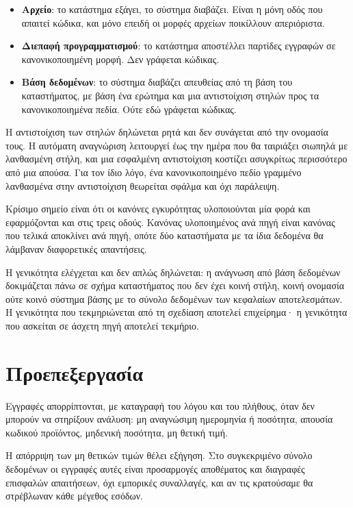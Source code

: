\begin{itemize}
  \item \textbf{Αρχείο}: το κατάστημα εξάγει, το σύστημα διαβάζει. Είναι η
        μόνη οδός που απαιτεί κώδικα, και μόνο επειδή οι μορφές αρχείων
        ποικίλλουν απεριόριστα.
  \item \textbf{Διεπαφή προγραμματισμού}: το κατάστημα αποστέλλει παρτίδες
        εγγραφών σε κανονικοποιημένη μορφή. Δεν γράφεται κώδικας.
  \item \textbf{Βάση δεδομένων}: το σύστημα διαβάζει απευθείας από τη βάση του
        καταστήματος, με βάση ένα ερώτημα και μια αντιστοίχιση στηλών προς τα
        κανονικοποιημένα πεδία. Ούτε εδώ γράφεται κώδικας.
\end{itemize}

Η αντιστοίχιση των στηλών δηλώνεται ρητά και δεν συνάγεται από την ονομασία
τους. Η αυτόματη αναγνώριση λειτουργεί έως την ημέρα που θα ταιριάξει σιωπηλά
με λανθασμένη στήλη, και μια εσφαλμένη αντιστοίχιση κοστίζει ασυγκρίτως
περισσότερο από μια απούσα. Για τον ίδιο λόγο, ένα κανονικοποιημένο πεδίο
γραμμένο λανθασμένα στην αντιστοίχιση θεωρείται σφάλμα και όχι παράλειψη.

Κρίσιμο σημείο είναι ότι οι κανόνες εγκυρότητας υλοποιούνται μία φορά και
εφαρμόζονται και στις τρεις οδούς. Κανόνας υλοποιημένος ανά πηγή είναι κανόνας
που τελικά αποκλίνει ανά πηγή, οπότε δύο καταστήματα με τα ίδια δεδομένα θα
λάμβαναν διαφορετικές απαντήσεις.

Η γενικότητα ελέγχεται και δεν απλώς δηλώνεται: η ανάγνωση από βάση δεδομένων
δοκιμάζεται πάνω σε σχήμα καταστήματος που δεν έχει κοινή στήλη, κοινή ονομασία
ούτε κοινό σύστημα βάσης με το σύνολο δεδομένων των κεφαλαίων αποτελεσμάτων. Η
γενικότητα που τεκμηριώνεται από τη σχεδίαση αποτελεί επιχείρημα· η γενικότητα
που ασκείται σε άσχετη πηγή αποτελεί τεκμήριο.

\section{Προεπεξεργασία}

Εγγραφές απορρίπτονται, με καταγραφή του λόγου και του πλήθους, όταν δεν
μπορούν να στηρίξουν ανάλυση: μη αναγνώσιμη ημερομηνία ή ποσότητα, απουσία
κωδικού προϊόντος, μηδενική ποσότητα, μη θετική τιμή.

Η απόρριψη των μη θετικών τιμών θέλει εξήγηση. Στο συγκεκριμένο σύνολο
δεδομένων οι εγγραφές αυτές είναι προσαρμογές αποθέματος και διαγραφές
επισφαλών απαιτήσεων, όχι εμπορικές συναλλαγές, και αν τις κρατούσαμε θα
στρέβλωναν κάθε μέγεθος εσόδων.

